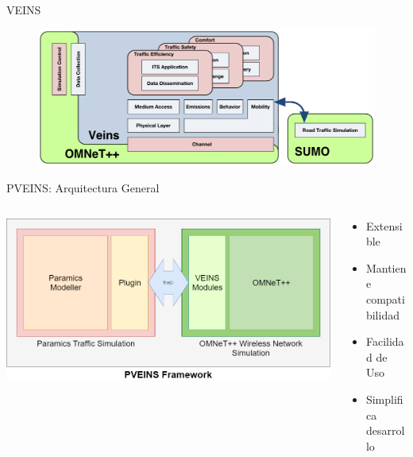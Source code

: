 \documentclass[aspectratio=169]{beamer}
\begin{document}
\begin{frame}{VEINS}
\begin{figure}
    \centering
    \includegraphics[width=\linewidth]{figuras/veins-arch.png}
\end{figure}
\end{frame}

\begin{frame}{PVEINS: Arquitectura General}
\begin{columns}
    \begin{column}{.7\linewidth}
        \centering
        \includegraphics[width=\linewidth]{figuras/PVEINSArch.png}
    \end{column}
    \begin{column}{.3\linewidth}
        \begin{itemize}
            \item Extensible
            \item Mantiene compatibilidad
            \item Facilidad de Uso
            \item Simplifica desarrollo
        \end{itemize}
    \end{column}
\end{columns}
\end{frame}
\end{document}
